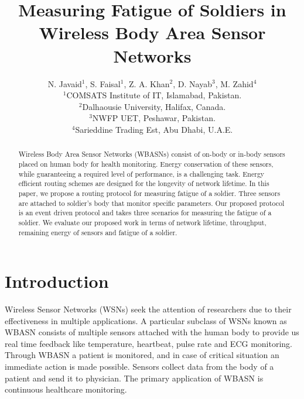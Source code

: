 \documentclass[journal]{IEEEtran}
\begin{document}
\title{Measuring Fatigue of Soldiers in\\ Wireless Body Area Sensor Networks}

\author{N. Javaid$^{1}$, S. Faisal$^{1}$, Z. A. Khan$^{2}$, D. Nayab$^{3}$, M. Zahid$^{4}$\\\vspace{0.4cm}
$^{1}$COMSATS Institute of IT, Islamabad, Pakistan.\\
        $^{2}$Dalhaousie University, Halifax, Canada.\\
        $^{3}$NWFP UET, Peshawar, Pakistan.\\
        $^{4}$Sarieddine Trading Est, Abu Dhabi, U.A.E.\\

     }

\maketitle

\begin{abstract}
Wireless Body Area Sensor Networks (WBASNs) consist of on-body or in-body sensors placed on human body for health monitoring. Energy conservation of these sensors,
while guaranteeing a required level of performance, is a challenging task. Energy efficient routing schemes are designed for the longevity of network lifetime.
In this paper, we propose a routing protocol for measuring fatigue of a soldier. Three sensors are attached to soldier's body that monitor specific parameters.
Our proposed protocol is an event driven protocol and takes three scenarios for measuring the fatigue of a soldier. We evaluate our proposed work in terms of
network lifetime, throughput, remaining energy of sensors and fatigue of a soldier.
\end{abstract}


\section{Introduction}
Wireless Sensor Networks (WSNs) seek the attention of researchers due to their effectiveness in multiple applications. A particular subclass of WSNs known as
WBASN consists of multiple sensors attached with the human body to provide us real time feedback like temperature, heartbeat, pulse rate and ECG monitoring.
Through WBASN a patient is monitored, and in case of critical situation an immediate action is made possible. Sensors collect data from the body of a patient
and send it to physician. The primary application of WBASN is continuous healthcare monitoring.
\end{document}
